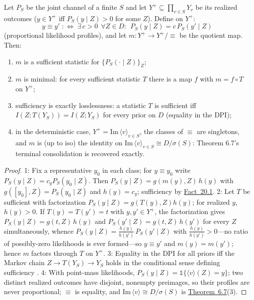 \begin{thmplain}

Let \(P_S\) be the joint channel of a finite \(S\) and let \(Y^+ \subseteq \prod_{v\in S} Y_v\) be its realized outcomes (\(y \in Y^+\) iff \(P_S(y \mid Z) > 0\) for some \(Z\)). Define on \(Y^+\):
\[
y \equiv y' \;:\iff\; \exists\, c > 0\ \ \forall Z \in D:\ \ P_S(y \mid Z) = c\, P_S(y' \mid Z)
\]
(proportional likelihood profiles), and let \(m : Y^+ \to Y^+/{\equiv}\) be the quotient map. Then:

\begin{enumerate}
\def\labelenumi{\arabic{enumi}.}
\tightlist
\item
  \(m\) is a sufficient statistic for \(\{P_S(\cdot \mid Z)\}_Z\);
\item
  \(m\) is minimal: for every sufficient statistic \(T\) there is a map \(f\) with \(m = f \circ T\) on \(Y^+\);
\item
  sufficiency is exactly losslessness: a statistic \(T\) is sufficient iff \(I(Z; T(Y_S)) = I(Z; Y_S)\) for every prior on \(D\) (equality in the DPI);
\item
  in the deterministic case, \(Y^+ = \mathrm{Im}\,\langle v \rangle_{v \in S}\), the classes of \(\equiv\) are singletons, and \(m\) is (up to iso) the identity on \(\mathrm{Im}\,\langle v\rangle_{v\in S} \cong D/\sigma(S)\): Theorem 6.7's terminal consolidation is recovered exactly.
\end{enumerate}
\end{thmplain}

\begin{proof}

1: Fix a representative \(y_0\) in each class; for \(y \equiv y_0\) write \(P_S(y \mid Z) = c_y P_S(y_0 \mid Z)\). Then \(P_S(y \mid Z) = g(m(y), Z)\, h(y)\) with \(g([y_0], Z) = P_S(y_0 \mid Z)\) and \(h(y) = c_y\); sufficiency by \hyperlink{stmt:20.1}{Fact~20.1}. 2: Let \(T\) be sufficient with factorization \(P_S(y \mid Z) = g(T(y), Z) h(y)\); for realized \(y\), \(h(y) > 0\). If \(T(y) = T(y') = t\) with \(y, y' \in Y^+\), the factorization gives \(P_S(y \mid Z) = g(t, Z)\, h(y)\) and \(P_S(y' \mid Z) = g(t, Z)\, h(y')\) for every \(Z\) simultaneously, whence \(P_S(y \mid Z) = \tfrac{h(y)}{h(y')}\, P_S(y' \mid Z)\) with \(\tfrac{h(y)}{h(y')} > 0\)---\hspace{0pt}no ratio of possibly-zero likelihoods is ever formed---\hspace{0pt}so \(y \equiv y'\) and \(m(y) = m(y')\); hence \(m\) factors through \(T\) on \(Y^+\). 3: Equality in the DPI for all priors iff the Markov chain \(Z \to T(Y_S) \to Y_S\) holds in the conditional sense defining sufficiency \autocite{cover2006}. 4: With point-mass likelihoods, \(P_S(y \mid Z) = \mathbb{1}\{\langle v\rangle(Z) = y\}\); two distinct realized outcomes have disjoint, nonempty preimages, so their profiles are never proportional; \(\equiv\) is equality, and \(\mathrm{Im}\,\langle v \rangle \cong D/\sigma(S)\) is \hyperlink{stmt:6.7}{Theorem~6.7}(3).
\end{proof}

